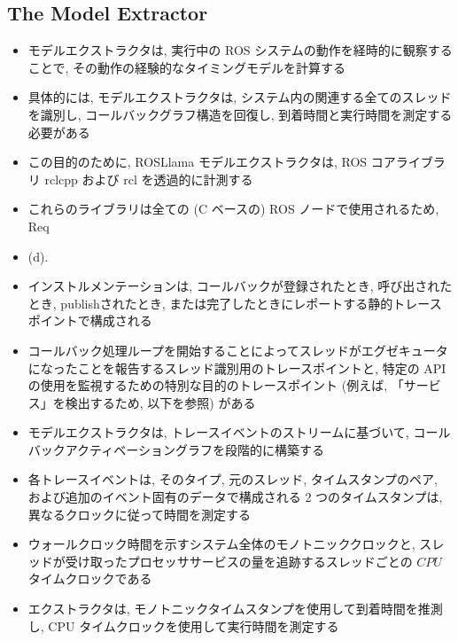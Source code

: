 \subsection{The Model Extractor}
\label{ssec: the model extractor}

\begin{frame}{}
    \begin{itemize}
        \item モデルエクストラクタは, 実行中の ROS システムの動作を経時的に観察することで, その動作の経験的なタイミングモデルを計算する
        \item 具体的には, モデルエクストラクタは, システム内の関連する全てのスレッドを識別し, コールバックグラフ構造を回復し, 到着時間と実行時間を測定する必要がある
        \item この目的のために, ROSLlama モデルエクストラクタは, ROS コアライブラリ $\mathrm{rclcpp}$ および $\mathrm{rcl}$ を透過的に計測する
        \item これらのライブラリは全ての (C ベースの) ROS ノードで使用されるため, Req
        \item (d).
    \end{itemize}
\end{frame}

\begin{frame}{}
    \begin{itemize}
        \item インストルメンテーションは, コールバックが登録されたとき, 呼び出されたとき, publishされたとき, または完了したときにレポートする静的トレースポイントで構成される
        \item コールバック処理ループを開始することによってスレッドがエグゼキュータになったことを報告するスレッド識別用のトレースポイントと, 特定の API の使用を監視するための特別な目的のトレースポイント (例えば, 「サービス」を検出するため, 以下を参照) がある
    \end{itemize}
\end{frame}

\begin{frame}{}
    \begin{itemize}
        \item モデルエクストラクタは, トレースイベントのストリームに基づいて, コールバックアクティベーショングラフを段階的に構築する
        \item 各トレースイベントは, そのタイプ, 元のスレッド, タイムスタンプのペア, および追加のイベント固有のデータで構成される 2 つのタイムスタンプは, 異なるクロックに従って時間を測定する
        \item ウォールクロック時間を示すシステム全体のモノトニッククロックと, スレッドが受け取ったプロセッササービスの量を追跡するスレッドごとの $C P U$ タイムクロックである
        \item エクストラクタは, モノトニックタイムスタンプを使用して到着時間を推測し, CPU タイムクロックを使用して実行時間を測定する
    \end{itemize}
\end{frame}

